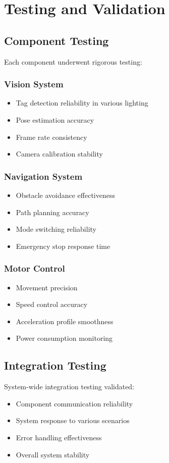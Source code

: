 \documentclass{article}
\begin{document}
\newpage
\section{Testing and Validation}
\subsection{Component Testing}
Each component underwent rigorous testing:

\subsubsection{Vision System}
\begin{itemize}
    \item Tag detection reliability in various lighting
    \item Pose estimation accuracy
    \item Frame rate consistency
    \item Camera calibration stability
\end{itemize}

\subsubsection{Navigation System}
\begin{itemize}
    \item Obstacle avoidance effectiveness
    \item Path planning accuracy
    \item Mode switching reliability
    \item Emergency stop response time
\end{itemize}

\subsubsection{Motor Control}
\begin{itemize}
    \item Movement precision
    \item Speed control accuracy
    \item Acceleration profile smoothness
    \item Power consumption monitoring
\end{itemize}

\subsection{Integration Testing}
System-wide integration testing validated:
\begin{itemize}
    \item Component communication reliability
    \item System response to various scenarios
    \item Error handling effectiveness
    \item Overall system stability
\end{itemize}
\end{document}
